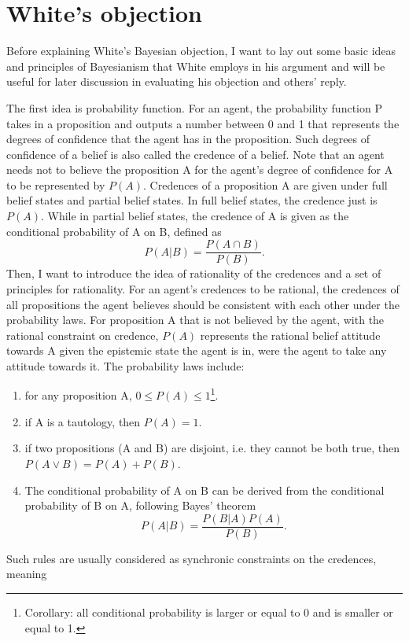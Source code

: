 \section{White's objection}

Before explaining White's Bayesian objection, I want to lay out some
basic ideas and principles of Bayesianism that White employs in his
argument and will be useful for later discussion in evaluating his
objection and others' reply.

The first idea is probability function. For an agent, the probability
function P takes in a proposition and outputs a number between 0 and 1
that represents the degrees of confidence that the agent has in the
proposition. Such degrees of confidence of a belief is also called the
credence of a belief. Note that an agent needs not to believe the
proposition A for the agent's degree of confidence for A to be
represented by \(P(A)\). Credences of a proposition A are given under
full belief states and partial belief states. In full belief states, the
credence just is \(P(A)\). While in partial belief states, the credence
of A is given as the conditional probability of A on B, defined as
\[ P(A|B) = \frac{P(A \cap B)}{P(B)}.\]
Then, I want to introduce the idea of rationality of the credences and a
set of principles for rationality. For an agent's credences to be
rational, the credences of all propositions the agent believes should be
consistent with each other under the probability laws. For proposition A
that is not believed by the agent, with the rational constraint on
credence, \(P(A)\) represents the rational belief attitude towards A
given the epistemic state the agent is in, were the agent to take any
attitude towards it. The probability laws include:
	\begin{enumerate}[label=\arabic*.]
		\item for any proposition A, \(0 \leq P(A) \leq 1\)\footnote{Corollary: all
  conditional probability is larger or equal to 0 and is smaller or
  equal to 1.}.
  		\item if A is a tautology, then \(P(A) = 1\). 
  		\item if two propositions (A and B) are disjoint, i.e. they cannot be both true, then
\(P(A \vee B) = P(A) + P(B)\). 
		\item The conditional probability of A on B
can be derived from the conditional probability of B on A, following
Bayes' theorem 
			\[ P(A|B) = \frac{P(B|A)P(A)}{P(B)}. \]
	\end{enumerate}		
Such rules are
usually considered as synchronic constraints on the credences, meaning
